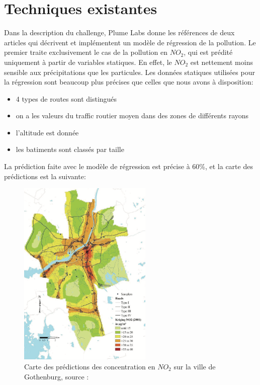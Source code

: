 \section{Techniques existantes}

Dans la description du challenge, Plume Labs donne les références de deux articles qui décrivent et implémentent un modèle de régression de la pollution.
Le premier \cite{NO2reg} traite exclusivement le cas de la pollution en $NO_2$, qui est prédité uniquement à partir de variables statiques.
En effet, le $NO_2$ est nettement moins sensible aux précipitations que les particules.
Les données statiques utilisées pour la régression sont beaucoup plus précises que celles que nous avons à disposition:
\begin{itemize}
  \item 4 types de routes sont distingués
  \item on a les valeurs du traffic routier moyen dans des zones de différents rayons
  \item l'altitude est donnée
  \item les batiments sont classés par taille
\end{itemize}

La prédiction faite avec le modèle de régression est précise à 60\%, et la carte des prédictions est la suivante:

\begin{figure}
\begin{center}
  \includegraphics[height=9cm]{images/pollution_gothenburg.png}
  \caption{Carte des prédictions des concentration en $NO_2$ sur la ville de Gothenburg, source : \cite{NO2reg}}
\end{center}
\end{figure}


